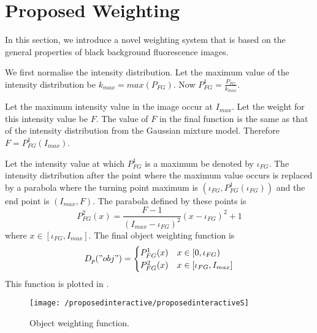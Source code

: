 \section{Proposed Weighting}
\label{sec:interactiveproposedweighting}

In this section, we introduce a novel weighting system that is based on the general properties of black background fluorescence images.

\begin{definition}
	We first normalise the intensity distribution. Let the maximum value of the intensity distribution be $k_{max}= max(P_{FG})$. Now $P_{FG}^{1} = \frac{P_{FG}}{k_{max}}$.
	
	Let the maximum intensity value in the image occur at $I_{max}$. Let the weight for this intensity value be $F$. The value of $F$ in the final function is the same as that of the intensity distribution from the Gaussian mixture model. Therefore $F = P_{FG}^{1}(I_{max})$.
	
	Let the intensity value at which $P_{FG}^{1}$ is a maximum be denoted by $\iota_{FG}$. The intensity distribution after the point where the maximum value occurs is replaced by a parabola where the turning point maximum is $\left(\iota_{FG}, P_{FG}^{1}(\iota_{FG})\right)$ and the end point is $(I_{max},F)$. The parabola defined by these points is 
	\begin{equation}
		P_{FG}^2(x) = \frac{F-1}{(I_{max}-\iota_{FG})^2}(x-\iota_{FG})^2 +1 
	\end{equation}
	where $x \in [\iota_{FG},I_{max}]$.
	The final object weighting function  is
	\begin{equation}
		D_p("obj") = \begin{cases} 
		P_{FG}^1(x) & x \in [0,\iota_{FG}) \\
		P_{FG}^2(x) & x \in [\iota_{FG},I_{max}]
		\end{cases}
	\end{equation}
	This function is plotted in . 
		
	\begin{figure}[!h]
		\centering
		\texttt{[image: /proposedinteractive/proposedinteractiveS]}
		\caption{Object weighting function.}
		\label{fig:proposedinteractiveS}
	\end{figure}
\end{definition}

